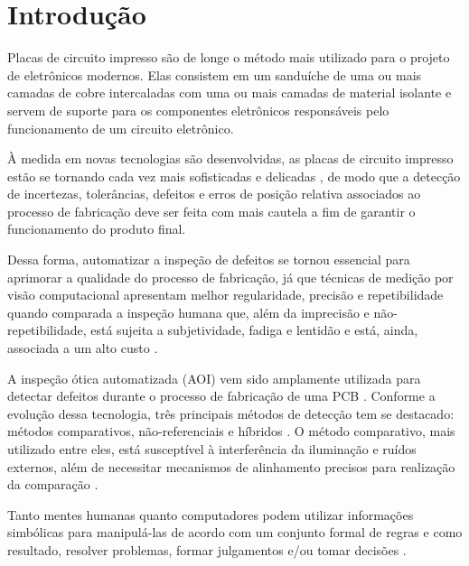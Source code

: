 \chapter{Introdução}
Placas de circuito impresso são de longe o método mais utilizado para o projeto de eletrônicos modernos. Elas consistem em um sanduíche de uma ou mais camadas de cobre intercaladas com uma ou mais camadas de material isolante \cite{ref:Zumbahlen} e servem de suporte para os componentes eletrônicos responsáveis pelo funcionamento de um circuito eletrônico.

À medida em novas tecnologias são desenvolvidas, as placas de circuito impresso estão se tornando cada vez mais sofisticadas e delicadas \cite{ref:Hu-Wang}, de modo que a detecção de incertezas, tolerâncias, defeitos e erros de posição relativa associados ao processo de fabricação \cite{ref:Leta-Feliciano-Martins} deve ser feita com mais cautela a fim de garantir o funcionamento do produto final.

Dessa forma, automatizar a inspeção de defeitos se tornou essencial para aprimorar a qualidade do processo de fabricação, já que técnicas de medição por visão computacional apresentam melhor regularidade, precisão e repetibilidade quando comparada a inspeção humana que, além da imprecisão e não-repetibilidade, está sujeita a subjetividade, fadiga e lentidão e está, ainda, associada a um alto custo \cite{ref:Leta-Feliciano-Martins}.

A inspeção ótica automatizada (AOI) vem sido amplamente utilizada para detectar defeitos durante o processo de fabricação de uma PCB \cite{ref:Chin-Harlow}. Conforme a evolução dessa tecnologia, três principais métodos de detecção tem se destacado: métodos comparativos, não-referenciais e híbridos \cite{ref:Wu-Wang-Liu}. O método comparativo, mais utilizado entre eles, está susceptível à interferência da iluminação e ruídos externos, além de necessitar mecanismos de alinhamento precisos para realização da comparação \cite{ref:Hu-Wang}.

Tanto mentes humanas quanto computadores podem utilizar informações simbólicas para manipulá-las de acordo com um conjunto formal de regras e como resultado, resolver problemas, formar julgamentos e/ou tomar decisões \cite{ref:Harvard-AI}.



